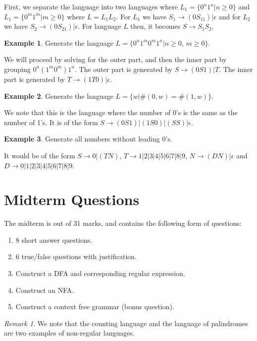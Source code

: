 \documentclass[11pt]{article}
\theoremstyle{plain} %
\theoremstyle{definition}
\theoremstyle{example}
\newtheorem*{example}{Example}
\theoremstyle{remark}
\newtheorem*{remark}{Remark}
\begin{document}
First, we separate the language into two languages where $L_1 = \{0^n1^n | n \geq 0\}$ and $L_1 = \{0^m1^m | m \geq 0\}$ where $L = L_1L_2$. For $L_1$ we have $S_1 \rightarrow (0S_11)|\epsilon$ and for $L_2$ we have $S_2\rightarrow (0S_21)|\epsilon$. For language $L$ then, it becomes $S \rightarrow S_1S_2$.

\begin{example}
Generate the language $L = \{0^n1^m0^m1^n | n \geq 0$, $m \geq 0\}$.
\end{example}

We will proceed by solving for the outer part, and then the inner part by grouping $0^n(1^m0^m)1^n$. The outer part is generated by $S \rightarrow (0S1) | T$. The inner part is generated by $T \rightarrow (1T0)|\epsilon$.

\begin{example}
Generate the language $L = \{w | \#(0,w) = \#(1,w)\}$.
\end{example}

We note that this is the language where the number of 0's is the same as the number of 1's. It is of the form $S \rightarrow (0S1)|(1S0)|(SS)|\epsilon$.


\begin{example}
Generate all numbers without leading 0's.
\end{example}

It would be of the form $S \rightarrow 0 | (TN)$, $T \rightarrow 1|2|3|4|5|6|7|8|9$, $N \rightarrow (DN)|\epsilon$ and $D \rightarrow 0|1|2|3|4|5|6|7|8|9$.

\section{Midterm Questions}

The midterm is out of 31 marks, and contains the following form of questions:
\begin{enumerate}

	\item 8 short answer questions.
	\item 6 true/false questions with justification.
	\item Construct a DFA and corresponding regular expression.
	\item Construct an NFA.
	\item Construct a context free grammar (bonus question).

\end{enumerate}

 \begin{remark}
We note that the counting language and the language of palindromes are two examples of non-regular languages.
 \end{remark}
\end{document}
